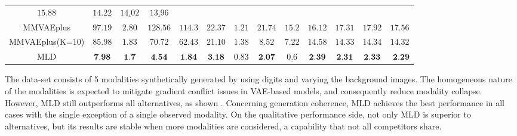 \begin{table}[h]
{\begin{tabular}{c|cccc|cccc|cccc}
    
    $15.88$   &
    $14.22$ &
    $\underline{14.02}$  &
    $\underline{13.96}$  
    \\

    
   \gls{MMVAEplus} &    
   
   $97.19$   &  
   $2.80$ &
    $128.56$  &
    $ 114.3$  &
 

        $22.37$   & 
    $1.21$ &
    $21.74$  &
    $15.2$  &


        $16.12$   &
        $17.31$ &
    $17.92$  &
    $17.56$
    
    \\

     \gls{MMVAEplus}(K=10) &    
   
   $85.98$   &  
   $1.83$ &
    $70.72$  &
    $62.43$  &
 

        $21.10$   & 
    $1.38$ &
    $8.52$  &
    $7.22$  &


   $14.58$   &  
   $14.33$ &
    $14.34$  &
    $14.32$  
    \\
    \midrule
    \gls{MLD} 
    &   
    $\textbf{7.98}$ &
    $\textbf{1.7}$ &
    $\textbf{4.54}$ & 
    $\textbf{1.84}$  &
    
    
    $\textbf{3.18}$ 
      & $0.83$ 
     & $\textbf{2.07}$ 
       & $\underline{0.6}$ 
       
       
       & $ \textbf{2.39} $
        & $\textbf{2.31}$ 
     & $\textbf{2.33}$ 
       & $\textbf{	2.29}$ 
       
       \\

    \bottomrule
   
\end{tabular}
}


 \label{qua:mhd}

\end{table}





The \textbf{\polymnist} data-set \citep{sutter2021generalized} consists of 5 modalities synthetically generated by using \mnist digits and varying the background images. The homogeneous nature of the modalities is expected to mitigate gradient conflict issues in \gls{VAE}-based models, and consequently reduce modality collapse. However, \gls{MLD} still outperforms all alternatives, as shown . Concerning generation coherence, \gls{MLD} achieves the best performance in all cases with the single exception of a single observed modality. On the qualitative performance side, not only \gls{MLD} is superior to alternatives, but its results are stable when more modalities are considered, a capability that not all competitors share. 

